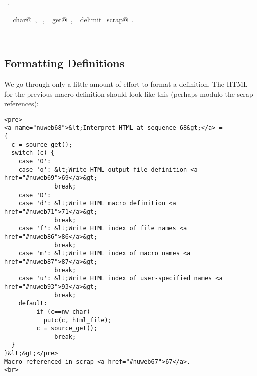 \documentclass{report}
\begin{document}
\begin{flushleft}
\begin{minipage}{\linewidth}
\begin{list}{}{}
\mbox{}\verb@            putc(c, html_file);@\\
\mbox{}\verb@          c = source_get();@\\
\mbox{}\verb@              break;@\\
\mbox{}\verb@  }@\\
\mbox{}\verb@}@{\NWsep}
\end{list}
\vspace{-1ex}
\footnotesize\addtolength{\baselineskip}{-1ex}
\begin{list}{}{\setlength{\itemsep}{-\parsep}\setlength{\itemindent}{-\leftmargin}}
\item \NWtxtMacroRefIn\ .
\end{list}
\vspace{-2ex}
\footnotesize\addtolength{\baselineskip}{-1ex}
\begin{list}{}{\setlength{\itemsep}{-\parsep}\setlength{\itemindent}{-\leftmargin}}
\item \NWtxtIdentsUsed\nobreak\  \verb@nw_char@\nobreak\ , \verb@putc@\nobreak\ , \verb@source_get@\nobreak\ , \verb@update_delimit_scrap@\nobreak\ .\end{list}
\end{minipage}\\[4ex]
\end{flushleft}
\subsection{Formatting Definitions}

We go through only a little amount of effort to format a definition.
The HTML for the previous macro definition should look like this
(perhaps modulo the scrap references):

\begin{verbatim}
<pre>
<a name="nuweb68">&lt;Interpret HTML at-sequence 68&gt;</a> =
{
  c = source_get();
  switch (c) {
    case 'O': 
    case 'o': &lt;Write HTML output file definition <a href="#nuweb69">69</a>&gt;
              break;
    case 'D': 
    case 'd': &lt;Write HTML macro definition <a href="#nuweb71">71</a>&gt;
              break;
    case 'f': &lt;Write HTML index of file names <a href="#nuweb86">86</a>&gt;
              break;
    case 'm': &lt;Write HTML index of macro names <a href="#nuweb87">87</a>&gt;
              break;
    case 'u': &lt;Write HTML index of user-specified names <a href="#nuweb93">93</a>&gt;
              break;
    default:  
         if (c==nw_char)
           putc(c, html_file);
         c = source_get();
              break;
  }
}&lt;&gt;</pre>
Macro referenced in scrap <a href="#nuweb67">67</a>.
<br>
\end{verbatim}
\end{document}
